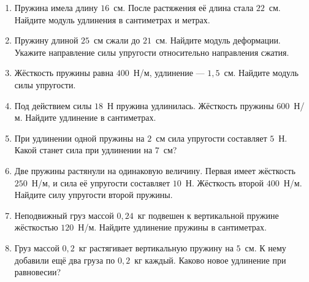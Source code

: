 \documentclass[a4paper,12pt]{article}
\begin{document}
\begin{enumerate}[label=\textbf{\arabic*.}]
\item Пружина имела длину $16$~см. После растяжения её длина стала $22$~см. Найдите модуль удлинения в сантиметрах и метрах.

\item Пружину длиной $25$~см сжали до $21$~см. Найдите модуль деформации. Укажите направление силы упругости относительно направления сжатия.

\item Жёсткость пружины равна $400$~Н/м, удлинение --- $1{,}5$~см. Найдите модуль силы упругости.

\item Под действием силы $18$~Н пружина удлинилась. Жёсткость пружины $600$~Н/м. Найдите удлинение в сантиметрах.

\item При удлинении одной пружины на $2$~см сила упругости составляет $5$~Н. Какой станет сила при удлинении на $7$~см?

\item Две пружины растянули на одинаковую величину. Первая имеет жёсткость $250$~Н/м, и сила её упругости составляет $10$~Н. Жёсткость второй $400$~Н/м. Найдите силу упругости второй пружины.

\item Неподвижный груз массой $0{,}24$~кг подвешен к вертикальной пружине жёсткостью $120$~Н/м. Найдите удлинение пружины в сантиметрах.

\item Груз массой $0{,}2$~кг растягивает вертикальную пружину на $5$~см. К нему добавили ещё два груза по $0{,}2$~кг каждый. Каково новое удлинение при равновесии?
\end{enumerate}
\end{document}
